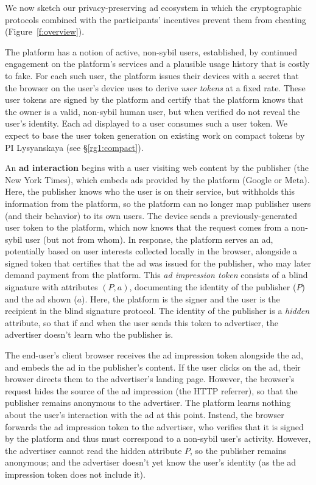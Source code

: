 %
We now sketch our privacy-preserving ad ecosystem in which the cryptographic protocols combined with the participants' incentives prevent them from cheating (Figure~\ref{f:overview}).
%

%
The platform has a notion of active, non-sybil users, established, \eg by continued engagement on the platform's services and a plausible usage history that is costly to fake.
%
For each such user, the platform issues their devices with a secret that the browser on the user's device uses to derive \emph{user tokens} at a fixed rate.
%
These user tokens are signed by the platform and certify that the platform knows that the owner is a valid, non-sybil human user, but when verified do not reveal the user's identity.
%
Each ad displayed to a user consumes such a user token.
%
We expect to base the user token generation on existing work on compact tokens by PI Lysyanskaya (see \S\ref{rg1:compact}).
%

%
An \textbf{ad interaction} begins with a user visiting web content by the publisher (\eg the New York Times), which embeds ads provided by the platform (\eg Google or Meta).
%
Here, the publisher knows who the user is on their service, but withholds this information from the platform, so the platform can no longer map publisher users (and their behavior) to its own users.
%
The device sends a previously-generated user token to the platform, which now knows that the request comes from a non-sybil user (but not from whom).
%
In response, the platform serves an ad, potentially based on user interests collected locally in the browser, alongside a signed token that certifies that the ad was issued for the publisher, who may later demand payment from the platform.
%
This \emph{ad impression token} consists of a blind signature with attributes $(P, a)$, documenting the identity of the publisher ($P$) and the ad shown ($a$).
%
Here, the platform is the signer and the user is the recipient in the blind signature protocol.
%
The identity of the publisher is a \emph{hidden} attribute, so that if and when the user sends this token to advertiser, the advertiser doesn't learn who the publisher is.%
%

%
The end-user's client browser receives the ad impression token alongside the ad, and embeds the ad in the publisher's content.
%
If the user clicks on the ad, their browser directs them to the advertiser's landing page.
%
However, the browser's request hides the source of the ad impression (\eg the HTTP referrer), so that the publisher remains anonymous to the advertiser.
%
The platform learns nothing about the user's interaction with the ad at this point.
%
Instead, the browser forwards the ad impression token to the advertiser, who verifies that it is signed by the platform and thus must correspond to a non-sybil user's activity.
%
However, the advertiser cannot read the hidden attribute $P$, so the publisher remains anonymous; and the advertiser doesn't yet know the user's identity (as the ad impression token does not include it).
%

